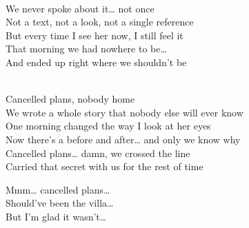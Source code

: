 \begin{lyrics}
\\
We never spoke about it… not once\\
Not a text, not a look, not a single reference\\
But every time I see her now, I still feel it\\
That morning we had nowhere to be…\\
And ended up right where we shouldn’t be

\\
Cancelled plans, nobody home\\
We wrote a whole story that nobody else will ever know\\
One morning changed the way I look at her eyes\\
Now there’s a before and after… and only we know why\\
Cancelled plans… damn, we crossed the line\\
Carried that secret with us for the rest of time

Mmm… cancelled plans…\\
Should’ve been the villa…\\
But I’m glad it wasn’t…

\end{lyrics}

